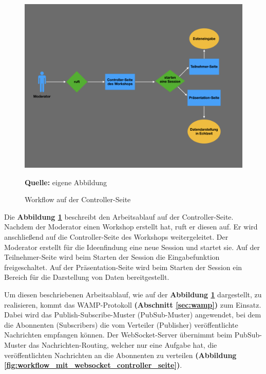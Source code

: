 \begin{figure}[H]
  \begin{center}
    \includegraphics[scale=0.35]{img/Workflow_controllerSeite}
	\caption{Workflow auf der Controller-Seite} 
	\footnotesize\sffamily\textbf{Quelle:} eigene Abbildung
	\label{fig:workflow_controller-seite}
  \end{center}   
\end{figure}

Die \textbf{Abbildung \ref{fig:workflow_controller-seite}} beschreibt den Arbeitsablauf auf der Controller-Seite. Nachdem der Moderator einen Workshop erstellt hat, ruft er diesen auf. Er wird anschließend auf die Controller-Seite des Workshops weitergeleitet.
Der Moderator erstellt für die Ideenfindung eine neue Session und startet sie. Auf der Teilnehmer-Seite wird beim Starten der Session die Eingabefunktion freigeschaltet. Auf der Präsentation-Seite wird beim Starten der Session ein Bereich für die Darstellung von Daten bereitgestellt.\bigskip

Um diesen beschriebenen Arbeitsablauf, wie auf der \textbf{Abbildung \ref{fig:workflow_controller-seite}} dargestellt, zu realisieren, kommt das WAMP-Protokoll \textbf{(Abschnitt \ref{sec:wamp})} zum Einsatz. Dabei wird das Publish-Subscribe-Muster (PubSub-Muster) angewendet, bei dem die Abonnenten (Subscribers) die vom Verteiler (Publisher) veröffentlichte Nachrichten empfangen können. Der WebSocket-Server übernimmt beim PubSub-Muster das Nachrichten-Routing, welcher nur eine Aufgabe hat, die veröffentlichten Nachrichten an die Abonnenten zu verteilen \textbf{(Abbildung \ref{fig:workflow_mit_websocket_controller_seite})}.\bigskip

